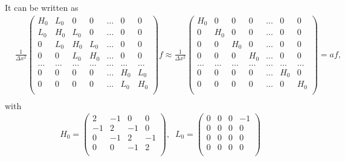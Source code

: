 It can be written as
\begin{equation}
\begin{split}
&\frac{1}{\Delta x^2}\begin{pmatrix}
H_0 & L_0 & 0 & 0 & \ldots & 0 & 0 \\
L_0 & H_0 & L_0 & 0 & \ldots & 0 & 0 \\
0 & L_0 & H_0 & L_0 & \ldots & 0 & 0 \\
0 & 0 & L_0 & H_0 & \ldots & 0 & 0 \\
\ldots & \ldots & \ldots & \ldots & \ldots & \ldots & \ldots \\
0 & 0 & 0 & 0 & \ldots & H_0 & L_0 \\
0 & 0 & 0 & 0 & \ldots & L_0 & H_0 \\
\end{pmatrix}f\approx 
\frac{1}{\Delta x^2}\begin{pmatrix}
H_0 & 0 & 0 & 0 & \ldots & 0 & 0 \\
0 & H_0 & 0 & 0 & \ldots & 0 & 0 \\
0 & 0 & H_0 & 0 & \ldots & 0 & 0 \\
0 & 0 & 0 & H_0 & \ldots & 0 & 0 \\
\ldots & \ldots & \ldots & \ldots & \ldots & \ldots & \ldots \\
0 & 0 & 0 & 0 & \ldots & H_0 & 0 \\
0 & 0 & 0 & 0 & \ldots & 0 & H_0 \\
\end{pmatrix}
=a f,\\
\end{split}
\end{equation}
with
\begin{equation}
\begin{split}
&H_0=\begin{pmatrix}
2 & -1 & 0 & 0 \\
-1 & 2 & -1 & 0 \\
0 & -1 & 2 & -1 \\
0 & 0 & -1 & 2 \\
\end{pmatrix},\;\;L_0=\begin{pmatrix}
0 & 0 & 0 & -1 \\
0 & 0 & 0 & 0 \\
0 & 0 & 0 & 0 \\
0 & 0 & 0 & 0 \\
\end{pmatrix}
\end{split}
\end{equation}    

